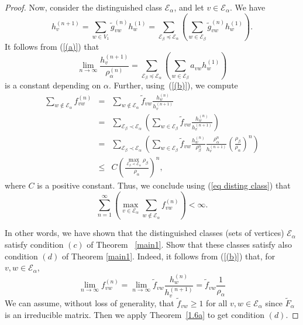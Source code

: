 \documentclass[11pt, english, reqno]{amsart}
\theoremstyle{definition}
\theoremstyle{remark}
\theoremstyle{plain}
\def\tl{\widetilde}
\numberwithin{equation}{section}
\begin{document}
{\begin{proof}
Now, consider the distinguished class $\mathcal{E}_{\alpha}$,
and let $v \in \mathcal{E}_{\alpha}$. We have
$$
h_v^{(n+1)} = \sum_{w \in V_1}\tl g_{vw}^{(n)} h_w^{(1)} =
\sum_{\mathcal{E}_{\beta} \preceq \mathcal{E}_{\alpha}}
\left(\sum_{w \in \mathcal{E}_{\beta}}\tl g_{vw}^{(n)} h_w^{(1)}\right).
$$
It follows  from (\ref{(a)}) that
\begin{equation}\label{(b)}
\lim_{n \rightarrow \infty}\frac{h_{v}^{(n+1)}}{\rho_{\alpha}^{(n)}} =
\sum_{\mathcal{E}_{\beta} \preceq \mathcal{E}_{\alpha}} \left(\sum_{w
\in \mathcal{E}_{\beta}}a_{vw} h_w^{(1)}\right)
\end{equation}
is a constant depending on $\alpha$.
Further, using~(\ref{(b)}), we compute
\begin{eqnarray*}
\sum_{w \notin \mathcal{E_{\alpha}}} f_{vw}^{(n)} &=&  \sum_{w \notin
\mathcal{E_{\alpha}}}\tl f_{vw}\frac{h_w^{(n)}}{h_v^{(n+1)}} \\
 &=&  \sum_{\mathcal{E}_{\beta} \prec \mathcal{E}_{\alpha}}
 \left(\sum_{w \in \mathcal{E}_{\beta}}\tl f_{vw}\frac{h_w^{(n)}}{h_v^{(n
 +1)}} \right)\\
 &=&   \sum_{\mathcal{E}_{\beta} \prec \mathcal{E}_{\alpha}}
 \left(\sum_{w \in \mathcal{E}_{\beta}} \tl f_{vw} \frac{h_w^{(n)}}
 {\rho_{\beta}^{n}} \frac{\rho_{\alpha}^{n}}{h_v^{(n+1)}}
 \left(\frac{\rho_{\beta}}{\rho_{\alpha}}\right)^{n} \right)\\
 &\leq& C \left(\frac{\max_{\mathcal{E}_{\beta} \prec
 \mathcal{E}_{\alpha}}\rho_{\beta}}{\rho_{\alpha}}\right)^{n},
 \end{eqnarray*}
where $C$ is a positive constant. Thus, we conclude using
(\ref{eq disting class}) that
$$
\sum_{n = 1}^{\infty}\left(\max_{v \in \mathcal{E}_{\alpha}}\sum_{w
\notin \mathcal{E}_{\alpha}}f_{vw}^{(n)}\right) < \infty.
$$

In other words, we have shown that the distinguished classes (sets of
vertices) $\mathcal{E}_{\alpha}$ satisfy condition $(c)$ of Theorem~
\ref{main1}. Show that these classes satisfy also condition $(d)$ of
Theorem \ref{main1}.
Indeed, it follows from (\ref{(b)}) that, for $v,w \in \mathcal{E}_{\alpha}$,
$$
\lim_{n \rightarrow \infty} f_{vw}^{(n)} = \lim_{n \rightarrow \infty}\tl
f_{vw}\frac{h_w^{(n)}}{h_v^{(n+1)}}
= \tl f_{vw} \frac{1}{\rho_{\alpha}}
$$
We can assume, without loss of generality,  that $\tl f_{vw} \geq 1$ for all
$v,w \in \mathcal{E}_{\alpha}$ since $\tl F_{\alpha}$ is an irreducible
matrix. Then we apply Theorem~\ref{1.6a} to get condition $(d)$.


\end{proof}}
\end{document}
